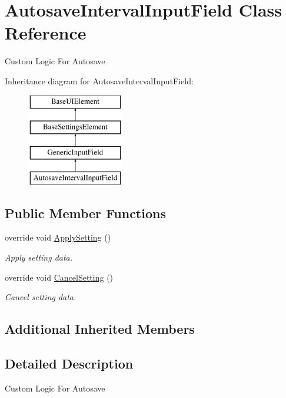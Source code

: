 \hypertarget{class_autosave_interval_input_field}{}\section{Autosave\+Interval\+Input\+Field Class Reference}
\label{class_autosave_interval_input_field}


Custom Logic For Autosave  


Inheritance diagram for Autosave\+Interval\+Input\+Field\+:\begin{figure}[H]
\begin{center}
\leavevmode
\includegraphics[height=4.000000cm]{class_autosave_interval_input_field}
\end{center}
\end{figure}
\subsection*{Public Member Functions}
\begin{DoxyCompactItemize}
\item 
override void \hyperlink{class_autosave_interval_input_field_aa1c438429994349876cc778f3280a01c}{Apply\+Setting} ()
\begin{DoxyCompactList}\small\item\em Apply setting data. \end{DoxyCompactList}\item 
override void \hyperlink{class_autosave_interval_input_field_a6c8ac107fc15d34c30e2a8f3709d2a5d}{Cancel\+Setting} ()
\begin{DoxyCompactList}\small\item\em Cancel setting data. \end{DoxyCompactList}\end{DoxyCompactItemize}
\subsection*{Additional Inherited Members}


\subsection{Detailed Description}
Custom Logic For Autosave 



